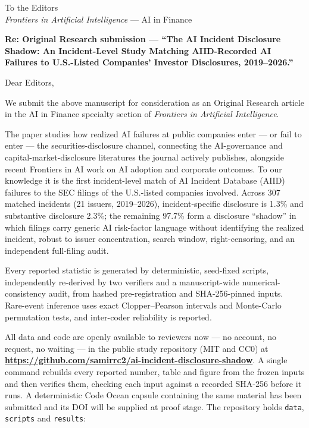 \documentclass[11pt]{article}
\begin{document}
To the Editors\\
\emph{Frontiers in Artificial Intelligence} --- AI in Finance

\vspace{4pt}
\textbf{Re: Original Research submission --- ``The AI Incident Disclosure Shadow: An Incident-Level Study Matching AIID-Recorded AI Failures to U.S.-Listed Companies' Investor Disclosures, 2019--2026.''}

\vspace{6pt}
Dear Editors,

We submit the above manuscript for consideration as an Original Research article in the AI in Finance specialty section of \emph{Frontiers in Artificial Intelligence}.

The paper studies how realized AI failures at public companies enter --- or fail to enter --- the securities-disclosure channel, connecting the AI-governance and capital-market-disclosure literatures the journal actively publishes, alongside recent Frontiers in AI work on AI adoption and corporate outcomes. To our knowledge it is the first incident-level match of AI Incident Database (AIID) failures to the SEC filings of the U.S.-listed companies involved. Across 307 matched incidents (21 issuers, 2019--2026), incident-specific disclosure is 1.3\% and substantive disclosure 2.3\%; the remaining 97.7\% form a disclosure ``shadow'' in which filings carry generic AI risk-factor language without identifying the realized incident, robust to issuer concentration, search window, right-censoring, and an independent full-filing audit.

Every reported statistic is generated by deterministic, seed-fixed scripts, independently re-derived by two verifiers and a manuscript-wide numerical-consistency audit, from hashed pre-registration and SHA-256-pinned inputs. Rare-event inference uses exact Clopper--Pearson intervals and Monte-Carlo permutation tests, and inter-coder reliability is reported.

All data and code are openly available to reviewers now --- no account, no request, no waiting --- in the public study repository (MIT and CC0) at \textbf{\url{https://github.com/samirrc2/ai-incident-disclosure-shadow}}. A single command rebuilds every reported number, table and figure from the frozen inputs and then verifies them, checking each input against a recorded SHA-256 before it runs. A deterministic Code Ocean capsule containing the same material has been submitted and its DOI will be supplied at proof stage. The repository holds \texttt{data}, \texttt{scripts} and \texttt{results}:
\end{document}
